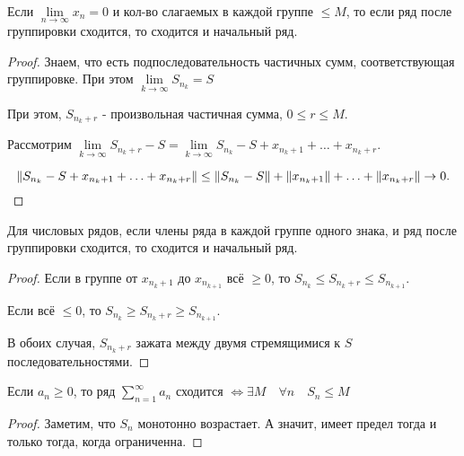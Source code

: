 \begin{theorem} \thmslashn

    Если $\lim\limits_{n \to \infty} x_{n} = 0$ и кол-во слагаемых в каждой группе $\le M$, то если ряд после группировки сходится, то сходится и начальный ряд.
    \begin{proof} \thmslashn
    
        Знаем, что есть подпоследовательность частичных сумм, соответствующая группировке. При этом $\lim\limits_{k \to \infty} S_{n_k} = S$

        При этом, $S_{n_{k} + r}$ - произвольная частичная сумма, $0 \le r \le M$.

        Рассмотрим $\lim\limits_{k \to \infty} S_{n_{k} + r} - S = \lim\limits_{k \to \infty} S_{n_{k}} - S + x_{n_k + 1} + \ldots + x_{n_k + r}$.

        \[ \|S_{n_k} - S + x_{n_{k} + 1} + \ldots + x_{n_k + r}\| \le \|S_{n_k} - S\| + \|x_{n_k + 1}\| + \ldots + \|x_{n_k + r}\| \to 0 .\qedhere\] 
    \end{proof}
\end{theorem}
\begin{theorem} \thmslashn

    Для числовых рядов, если члены ряда в каждой группе одного знака, и ряд после группировки сходится, то сходится и начальный ряд.
    \begin{proof} \thmslashn
    
        Если в группе от $x_{n_k + 1}$ до $x_{n_{k+1}}$ всё $\ge 0$, то $S_{n_k} \le S_{n_{k} + r} \le  S_{n_{k+1}}$. 

        Если всё $\le 0$, то $S_{n_k} \ge S_{n_{k} + r} \ge S_{n_{k+1}}$.

        В обоих случая, $S_{n_{k} + r}$ зажата между двумя стремящимися к $S$ последовательностями.
    \end{proof}
\end{theorem}
\begin{theorem} \thmslashn

    Если $a_{n} \ge 0$, то ряд $\sum\limits_{n=1}^{\infty} a_{n}$ сходится $\iff \exists{M}\quad \forall{n}\quad S_{n} \le M$
    \begin{proof} \thmslashn
    
        Заметим, что $S_{n}$ монотонно возрастает. А значит, имеет предел тогда и только тогда, когда ограниченна.
    \end{proof}
\end{theorem}
